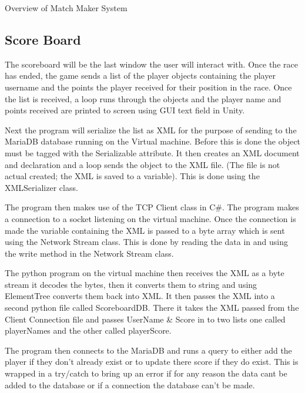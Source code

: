 Overview of Match Maker System
\subsection {Score Board}

\newline

The scoreboard will be the last window the user will interact with. Once the race has ended, the game sends a list of the player objects containing the player username and the points the player received for their position in the race. Once the list is received, a loop runs through the objects and the player name and points received are printed to screen using GUI text field in Unity.
\newline

Next the program will serialize the list as XML for the purpose of sending to the MariaDB database running on the Virtual machine. Before this is done the object must be tagged with the Serializable attribute. It then creates an XML document and declaration and a loop sends the object to the XML file. (The file is not actual created; the XML is saved to a variable). This is done using the XMLSerializer class.
\cite {93513120150101}

\newline

The program then makes use of the TCP Client class in C\#. The program makes a connection to a socket listening on the virtual machine. Once the connection is made the variable containing the XML is passed to a byte array which is sent using the Network Stream class. This is done by reading the data in and using the write method in the Network Stream class.
\cite {27494020090101}

\newline

The python program on the virtual machine then receives the XML as a byte stream it decodes the bytes, then it converts them to string and using ElementTree converts them back into XML. It then passes the XML into a second python file called ScoreboardDB. There it takes the XML passed from the Client Connection file and passes UserName & Score in to two lists one called playerNames and the other called playerScore.
\newline

The program then connects to the MariaDB and runs a query to either add the player if they don't already exist or to update there score if they do exist. This is wrapped in a try/catch to bring up an error if for any reason the data cant be added to the database or if a connection the database can't be made.
\newline

